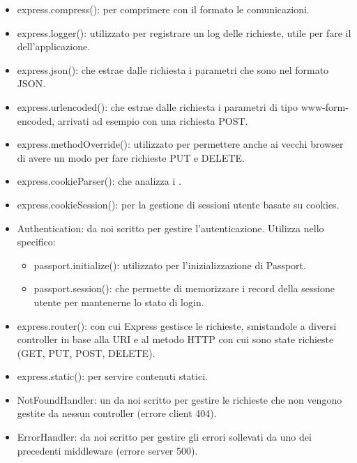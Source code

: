 \begin{itemize}
\item{express.compress()}:  per comprimere  con il formato  le comunicazioni.
\item{express.logger()}:  utilizzato per registrare un log delle richieste, utile per fare il
 dell'applicazione.
\item{express.json()}:  che estrae dalle richiesta i parametri che sono nel formato JSON.
\item{express.urlencoded()}:  che estrae dalle richiesta i parametri di tipo www-form-encoded, arrivati ad esempio con una richiesta POST.
\item{express.methodOverride()}:  utilizzato per permettere anche ai vecchi browser di avere un modo per fare richieste PUT e DELETE.
\item{express.cookieParser()}:  che analizza i .
\item{express.cookieSession()}:  per la gestione di sessioni utente basate su cookies.
\item{Authentication}:  da noi scritto per gestire l'autenticazione. Utilizza nello specifico:
	\begin{itemize}
	\item{passport.initialize()}:  utilizzato per l'inizializzazione di Passport.
	\item{passport.session()}:   che permette di memorizzare i record della sessione utente per mantenerne lo stato di login. 
	\end{itemize}
\item{express.router()}:  con cui Express gestisce le richieste, smistandole a diversi controller in base alla URI e al metodo HTTP con cui sono state richieste (GET, PUT, POST, DELETE).
\item{express.static()}:  per servire contenuti statici.
\item{NotFoundHandler}: un  da noi scritto per gestire le richieste che non vengono gestite da nessun controller (errore client 404).
\item{ErrorHandler}:  da noi scritto per gestire gli errori sollevati da uno dei precedenti middleware (errore server 500).
\end{itemize}

